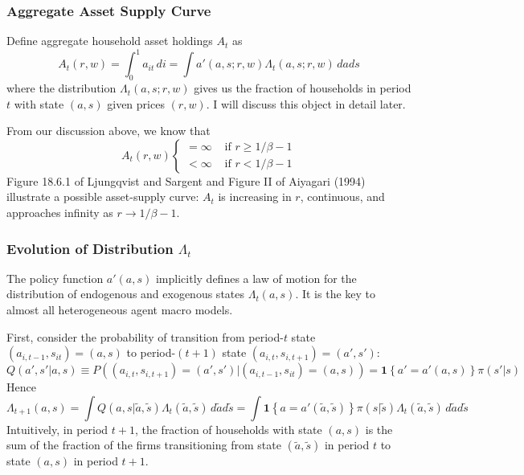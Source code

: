 \documentclass[12pt]{article}
\begin{document}
\subsubsection{Aggregate Asset Supply Curve}
Define aggregate household asset holdings $A_t$ as
\begin{equation}
A_t(r,w) = \int_0^1 a_{it} \,di = \int a'(a,s; r, w) \Lambda_t(a,s; r,w) \,da ds	
\end{equation}
where the distribution $\Lambda_t(a,s; r, w)$ gives us the fraction of households in period $t$ with state $(a,s)$ given prices $(r,w)$. I will discuss this object in detail later.

From our discussion above, we know that 
\begin{equation}
	A_t(r,w)
	\begin{cases}
	 = \infty & \text{ if $r \geq 1/\beta -1$} \\
	 < \infty & \text{ if $r < 1/\beta -1$}	
	\end{cases}
\end{equation}
Figure 18.6.1 of Ljungqvist and Sargent and Figure II of Aiyagari (1994) illustrate a possible asset-supply curve: $A_t$ is increasing in $r$, continuous, and approaches infinity as $r \to 1/\beta -1$.

\subsubsection{Evolution of Distribution $\Lambda_t$}
The policy function $a'(a,s)$ implicitly defines a law of motion for the distribution of endogenous and exogenous states $\Lambda_t(a,s)$. It is the key to almost all heterogeneous agent macro models.

First, consider the probability of transition from period-$t$ state $(a_{i,t-1}, s_{it}) = (a,s)$ to period-$(t+1)$ state $(a_{i,t}, s_{i,t+1}) = (a',s')$:
\begin{equation}
	Q(a',s'|a,s) \equiv P((a_{i,t}, s_{i,t+1}) = (a',s')|(a_{i,t-1}, s_{it}) = (a,s)) = \mathbf{1}\left\{a' = a'(a, s)\right\} \pi(s'|s)
\end{equation}
Hence
\begin{equation} \label{eq:law_distribution}
	\Lambda_{t+1}(a,s) = \int Q(a,s|\tilde{a}, \tilde{s}) \Lambda_t(\tilde{a}, \tilde{s}) \, d\tilde{a} d\tilde{s} = \int \mathbf{1}\left\{a = a'(\tilde{a}, \tilde{s})\right\} \pi(s|\tilde{s}) \Lambda_t(\tilde{a}, \tilde{s})\, d\tilde{a} d\tilde{s}
\end{equation}
Intuitively, in period $t+1$, the fraction of households with state $(a,s)$ is the sum of the fraction of the firms transitioning from state $(\tilde{a}, \tilde{s})$ in period $t$ to state $(a,s)$ in period $t+1$.
\end{document}
